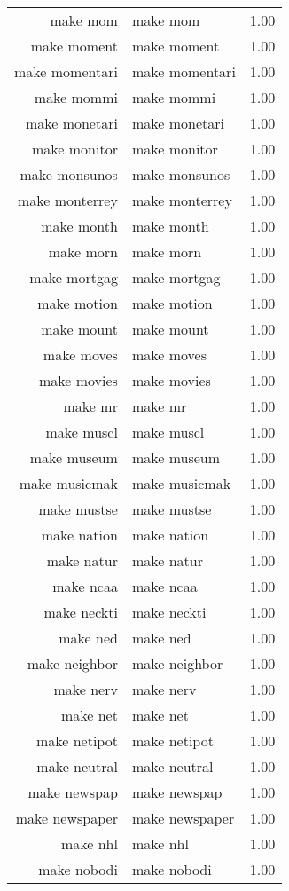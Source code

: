 \begin{table}[ht]
\begin{tabular}{rlr}
  make mom & make mom & 1.00 \\ 
  make moment & make moment & 1.00 \\ 
  make momentari & make momentari & 1.00 \\ 
  make mommi & make mommi & 1.00 \\ 
  make monetari & make monetari & 1.00 \\ 
  make monitor & make monitor & 1.00 \\ 
  make monsunos & make monsunos & 1.00 \\ 
  make monterrey & make monterrey & 1.00 \\ 
  make month & make month & 1.00 \\ 
  make morn & make morn & 1.00 \\ 
  make mortgag & make mortgag & 1.00 \\ 
  make motion & make motion & 1.00 \\ 
  make mount & make mount & 1.00 \\ 
  make moves & make moves & 1.00 \\ 
  make movies & make movies & 1.00 \\ 
  make mr & make mr & 1.00 \\ 
  make muscl & make muscl & 1.00 \\ 
  make museum & make museum & 1.00 \\ 
  make musicmak & make musicmak & 1.00 \\ 
  make mustse & make mustse & 1.00 \\ 
  make nation & make nation & 1.00 \\ 
  make natur & make natur & 1.00 \\ 
  make ncaa & make ncaa & 1.00 \\ 
  make neckti & make neckti & 1.00 \\ 
  make ned & make ned & 1.00 \\ 
  make neighbor & make neighbor & 1.00 \\ 
  make nerv & make nerv & 1.00 \\ 
  make net & make net & 1.00 \\ 
  make netipot & make netipot & 1.00 \\ 
  make neutral & make neutral & 1.00 \\ 
  make newspap & make newspap & 1.00 \\ 
  make newspaper & make newspaper & 1.00 \\ 
  make nhl & make nhl & 1.00 \\ 
  make nobodi & make nobodi & 1.00 \\ 

\end{tabular}
\end{table}
